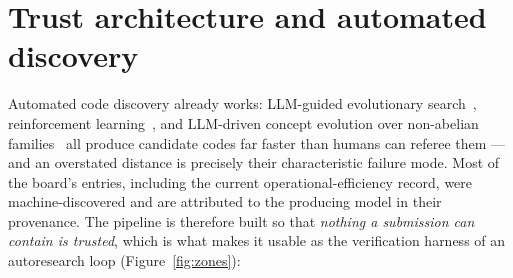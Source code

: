 \documentclass[11pt]{article}
\begin{document}
	\section{Trust architecture and automated discovery}
	\label{sec:trust}

	Automated code discovery already works: LLM-guided evolutionary
	search~\cite{cruzbenito2026evolutionary}, reinforcement
	learning~\cite{he2025reinforcement}, and LLM-driven concept evolution
	over non-abelian families~\cite{liu2026concept} all produce candidate
	codes far faster than humans can referee them --- and an overstated
	distance is precisely their characteristic failure mode. Most of the
	board's entries, including the current operational-efficiency record,
	were machine-discovered and are attributed to the producing model in
	their provenance. The pipeline is therefore built so that \emph{nothing
	a submission can contain is trusted}, which is what makes it usable as
	the verification harness of an autoresearch loop (Figure~\ref{fig:zones}):
\end{document}
